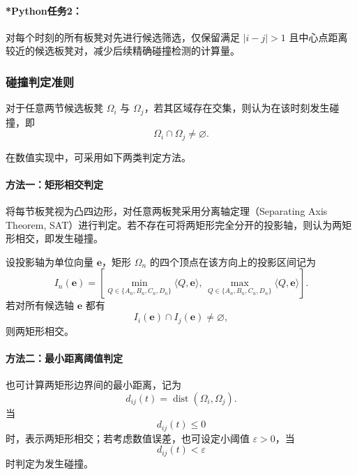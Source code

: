 \documentclass[12pt,a4paper]{ctexart}
\begin{document}
\paragraph{*Python任务2：}
对每个时刻的所有板凳对先进行候选筛选，仅保留满足 $|i-j|>1$ 且中心点距离较近的候选板凳对，减少后续精确碰撞检测的计算量。

\subsubsection{碰撞判定准则}
对于任意两节候选板凳 $\Omega_i$ 与 $\Omega_j$，若其区域存在交集，则认为在该时刻发生碰撞，即
\begin{equation}
\Omega_i \cap \Omega_j \neq \varnothing.
\end{equation}

在数值实现中，可采用如下两类判定方法。

\paragraph{方法一：矩形相交判定}
将每节板凳视为凸四边形，对任意两板凳采用分离轴定理（Separating Axis Theorem, SAT）进行判定。若不存在可将两矩形完全分开的投影轴，则认为两矩形相交，即发生碰撞。

设投影轴为单位向量 $\bm{e}$，矩形 $\Omega_n$ 的四个顶点在该方向上的投影区间记为
\begin{equation}
I_n(\bm{e})=
\left[
\min_{Q\in\{A_n,B_n,C_n,D_n\}}\langle Q,\bm{e}\rangle,\,
\max_{Q\in\{A_n,B_n,C_n,D_n\}}\langle Q,\bm{e}\rangle
\right].
\end{equation}
若对所有候选轴 $\bm{e}$ 都有
\begin{equation}
I_i(\bm{e})\cap I_j(\bm{e})\neq \varnothing,
\end{equation}
则两矩形相交。

\paragraph{方法二：最小距离阈值判定}
也可计算两矩形边界间的最小距离，记为
\begin{equation}
d_{ij}(t)=\operatorname{dist}(\Omega_i,\Omega_j).
\end{equation}
当
\begin{equation}
d_{ij}(t)\le 0
\end{equation}
时，表示两矩形相交；若考虑数值误差，也可设定小阈值 $\varepsilon>0$，当
\begin{equation}
d_{ij}(t)<\varepsilon
\end{equation}
时判定为发生碰撞。
\end{document}
